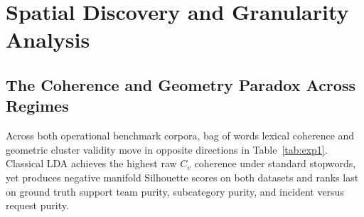 \documentclass[sigconf,anonymous,pbalance]{acmart}
\begin{document}
\section{Spatial Discovery and Granularity Analysis}

\subsection{The Coherence and Geometry Paradox Across Regimes}
Across both operational benchmark corpora, bag of words lexical coherence and geometric cluster validity move in opposite directions in Table~\ref{tab:exp1}. Classical LDA achieves the highest raw $C_v$ coherence under standard stopwords, yet produces negative manifold Silhouette scores on both datasets and ranks last on ground truth support team purity, subcategory purity, and incident versus request purity.
\end{document}
